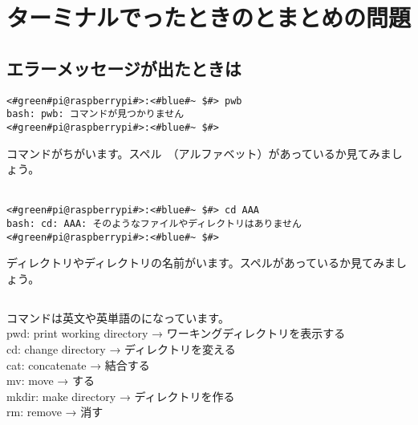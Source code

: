 \newpage
\section{ターミナルでったときのとまとめの問題}

\subsection{エラーメッセージが出たときは}
\begin{lstlisting}[caption=コマンドがちがうときの例, label=cmdMiss]
<#green#pi@raspberrypi#>:<#blue#~ $#> pwb
bash: pwb: コマンドが見つかりません
<#green#pi@raspberrypi#>:<#blue#~ $#> 
\end{lstlisting}
コマンドがちがいます。スペル　（アルファベット）があっているか見てみましょう。\\\\

\begin{lstlisting}[caption=ディレクトリやファイルの名前がちがうときの例, label=nameMiss]
<#green#pi@raspberrypi#>:<#blue#~ $#> cd AAA
bash: cd: AAA: そのようなファイルやディレクトリはありません
<#green#pi@raspberrypi#>:<#blue#~ $#> 
\end{lstlisting}
ディレクトリやディレクトリの名前がいます。スペルがあっているか見てみましょう。\\




\subsection{}
\label{英語と日本語の対応表}
コマンドは英文や英単語のになっています。\\
pwd: print working directory → ワーキングディレクトリを表示する\\
cd: change directory → ディレクトリを変える\\
cat: concatenate → 結合する\\
mv: move → する\\
mkdir: make directory → ディレクトリを作る\\
rm: remove → 消す\\
